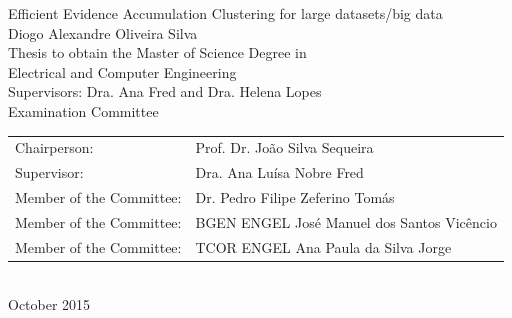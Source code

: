 \begin{center}
%
\vspace{2cm}
\vspace{3.0cm}
\vspace{1.0cm}
{\FontLb Efficient Evidence Accumulation Clustering for large datasets/big data} \\
\vspace{2.7cm}
{\FontMb Diogo Alexandre Oliveira Silva} \\
\vspace{2.0cm}
{\FontSn Thesis to obtain the Master of Science Degree in} \\
\vspace{0.3cm}
{\FontLb Electrical and Computer Engineering} \\
\vspace{1.1cm}
{\FontSn Supervisors: Dra. Ana Fred and Dra. Helena Lopes} \\
\vspace{1.1cm}
{\FontMb Examination Committee} \\
\vspace{0.3cm}
{\FontSn %
\begin{tabular}{ll}
Chairperson: & Prof. Dr. João Silva Sequeira \\
Supervisor: & Dra. Ana Luísa Nobre Fred \\
Member of the Committee: & Dr. Pedro Filipe Zeferino Tomás \\
Member of the Committee: & BGEN ENGEL José Manuel dos Santos Vicêncio \\%
Member of the Committee: & TCOR ENGEL Ana Paula da Silva Jorge%
\end{tabular} } \\
\vspace{1.5cm}
{\FontMb October 2015} \\
%
\end{center}

\cleardoublepage

